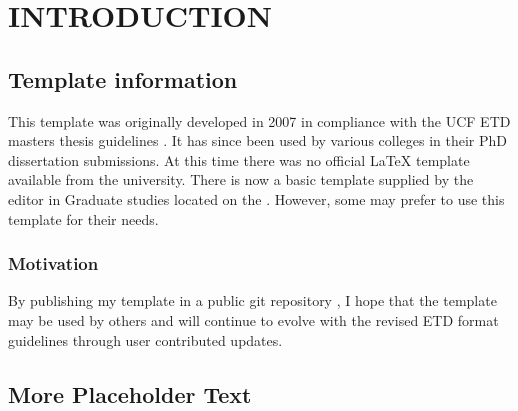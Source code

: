 %
%
%
%
%

\chapter{INTRODUCTION}

\lipsum[2] %


\section{Template information}
This template was originally developed in 2007 in compliance with the UCF ETD masters thesis guidelines \cite{ETD_Format}. It has since been used by various colleges in their PhD dissertation submissions. At this time there was no official LaTeX template available from the university. There is now a basic template supplied by the editor in Graduate studies located on the  \cite{ETD_Format}. However, some may prefer to use this template for their needs.

\subsection{Motivation}
By publishing my template in a public git repository \cite{TemplateGit}, I hope that the template may be used by others and will continue to evolve with the revised ETD format guidelines through user contributed updates.

\section{More Placeholder Text}
\lipsum[3-4] %